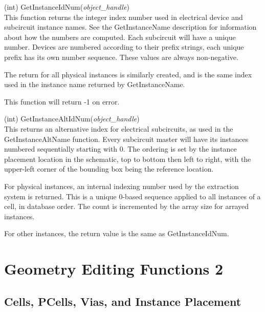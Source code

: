 \begin{description}
\item{(int) \vt GetInstanceIdNum({\it object\_handle\/})}\\
This function returns the integer index number used in electrical
device and subcircuit instance names.  See the {\vt GetInstanceName}
description for information about how the numbers are computed.  Each
subcircuit will have a unique number.  Devices are numbered according
to their prefix strings, each unique prefix has its own number
sequence.  These values are always non-negative.

The return for all physical instances is similarly created, and is the
same index used in the instance name returned by {\vt
GetInstanceName}.

This function will return -1 on error.

\item{(int) \vt GetInstanceAltIdNum({\it object\_handle\/})}\\
This returns an alternative index for electrical subcircuits, as used
in the {\vt GetInstanceAltName} function.  Every subcircuit master
will have its instances numbered sequentially starting with 0.  The
ordering is set by the instance placement location in the schematic,
top to bottom then left to right, with the upper-left corner of the
bounding box being the reference location.

For physical instances, an internal indexing number used by the
extraction system is returned.  This is a unique 0-based sequence
applied to all instances of a cell, in database order.  The count is
incremented by the array size for arrayed instances.

For other instances, the return value is the same as {\vt
GetInstanceIdNum}.
\end{description}

\section{Geometry Editing Functions 2}
\subsection{Cells, PCells, Vias, and Instance Placement}

